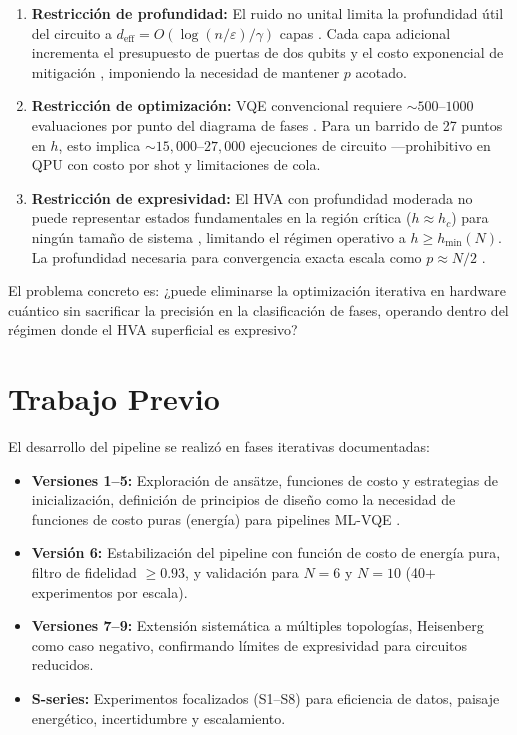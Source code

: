 \documentclass[11pt,a4paper,spanish]{book}
\begin{document}
\begin{enumerate}
    \item \textbf{Restricción de profundidad:} El ruido no unital limita la profundidad útil del circuito a $d_{\text{eff}} = O(\log(n/\varepsilon)/\gamma)$ capas \citep{mele2026}. Cada capa adicional incrementa el presupuesto de puertas de dos qubits y el costo exponencial de mitigación \citep{tsubouchi2023}, imponiendo la necesidad de mantener $p$ acotado.

    \item \textbf{Restricción de optimización:} VQE convencional requiere $\sim 500$--$1000$ evaluaciones por punto del diagrama de fases \citep{tilly2022}. Para un barrido de 27 puntos en $h$, esto implica $\sim 15{,}000$--$27{,}000$ ejecuciones de circuito ---prohibitivo en QPU con costo por shot y limitaciones de cola.

    \item \textbf{Restricción de expresividad:} El HVA con profundidad moderada no puede representar estados fundamentales en la región crítica ($h \approx h_c$) para ningún tamaño de sistema \citep{tripathi2026, sumeet2025}, limitando el régimen operativo a $h \geq h_{\min}(N)$. La profundidad necesaria para convergencia exacta escala como $p \approx N/2$ \citep{sumeet2025}.
\end{enumerate}

El problema concreto es: ¿puede eliminarse la optimización iterativa en hardware cuántico sin sacrificar la precisión en la clasificación de fases, operando dentro del régimen donde el HVA superficial es expresivo?

\section{Trabajo Previo}

El desarrollo del pipeline se realizó en fases iterativas documentadas:

\begin{itemize}
    \item \textbf{Versiones 1--5:} Exploración de ansätze, funciones de costo y estrategias de inicialización, definición de principios de diseño como la necesidad de funciones de costo puras (energía) para pipelines ML-VQE \citep{miao2024}.

    \item \textbf{Versión 6:} Estabilización del pipeline con función de costo de energía pura, filtro de fidelidad $\geq 0.93$, y validación para $N = 6$ y $N = 10$ (40+ experimentos por escala).

    \item \textbf{Versiones 7--9:} Extensión sistemática a múltiples topologías, Heisenberg como caso negativo, confirmando límites de expresividad para circuitos reducidos.

    \item \textbf{S-series:} Experimentos focalizados (S1--S8) para eficiencia de datos, paisaje energético, incertidumbre y escalamiento.
\end{itemize}
\end{document}
